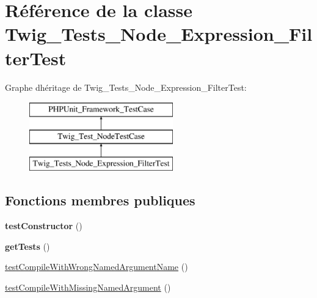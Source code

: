 \hypertarget{class_twig___tests___node___expression___filter_test}{}\section{Référence de la classe Twig\+\_\+\+Tests\+\_\+\+Node\+\_\+\+Expression\+\_\+\+Filter\+Test}
\label{class_twig___tests___node___expression___filter_test}
Graphe d\textquotesingle{}héritage de Twig\+\_\+\+Tests\+\_\+\+Node\+\_\+\+Expression\+\_\+\+Filter\+Test\+:\begin{figure}[H]
\begin{center}
\leavevmode
\includegraphics[height=3.000000cm]{class_twig___tests___node___expression___filter_test}
\end{center}
\end{figure}
\subsection*{Fonctions membres publiques}
\begin{DoxyCompactItemize}
\item 
{\bfseries test\+Constructor} ()\hypertarget{class_twig___tests___node___expression___filter_test_a47094dc941e72950570900d1418f89c6}{}\label{class_twig___tests___node___expression___filter_test_a47094dc941e72950570900d1418f89c6}

\item 
{\bfseries get\+Tests} ()\hypertarget{class_twig___tests___node___expression___filter_test_a7e247dd31cc8d37a6c97353a062a0080}{}\label{class_twig___tests___node___expression___filter_test_a7e247dd31cc8d37a6c97353a062a0080}

\item 
\hyperlink{class_twig___tests___node___expression___filter_test_a3baca49d4a6cb1511d313c4d6e59d8e6}{test\+Compile\+With\+Wrong\+Named\+Argument\+Name} ()
\item 
\hyperlink{class_twig___tests___node___expression___filter_test_a8716c47203ee270e69bcfff629715464}{test\+Compile\+With\+Missing\+Named\+Argument} ()
\end{DoxyCompactItemize}
